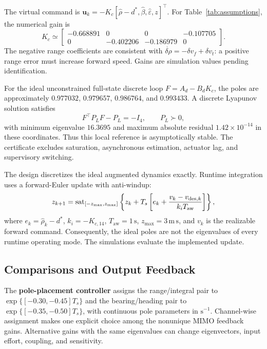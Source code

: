 The virtual command is $\mathbf u_k=-K_c[\hat\rho-d^\ast,\hat\beta,\hat\varepsilon,z]^\top$. For Table~\ref{tab:assumptions}, the numerical gain is
\begin{equation}
K_c\simeq\begin{bmatrix}
-0.668891&0&0&-0.107705\\
0&-0.402206&-0.186979&0
\end{bmatrix}.
\end{equation}
The negative range coefficients are consistent with $\dot{\delta\rho}=-\delta v_f+\delta v_t$: a positive range error must increase forward speed. Gains are simulation values pending identification.

For the ideal unconstrained full-state discrete loop $F=A_d-B_dK_c$, the poles are approximately $0.977032$, $0.979657$, $0.986764$, and $0.993433$. A discrete Lyapunov solution satisfies
\begin{equation}
F^\top P_LF-P_L=-I_4,\qquad P_L\succ0,
\end{equation}
with minimum eigenvalue $16.3695$ and maximum absolute residual $1.42\times10^{-14}$ in these coordinates. Thus this local reference is asymptotically stable. The certificate excludes saturation, asynchronous estimation, actuator lag, and supervisory switching.

The design discretizes the ideal augmented dynamics exactly. Runtime integration uses a forward-Euler update with anti-windup:
\begin{equation}
z_{k+1}=\operatorname{sat}_{[-z_{\max},z_{\max}]}\left\{z_k+T_s\left[e_k+\frac{v_k-v_{\mathrm{des},k}}{k_iT_{\mathrm{aw}}}\right]\right\},
\end{equation}
where $e_k=\hat\rho_k-d^\ast$, $k_i=-K_{c,14}$, $T_{\mathrm{aw}}=1\,\mathrm s$, $z_{\max}=3\,\mathrm{m\,s}$, and $v_k$ is the realizable forward command. Consequently, the ideal poles are not the eigenvalues of every runtime operating mode. The simulations evaluate the implemented update.

\subsection{Comparisons and Output Feedback}
The \textbf{pole-placement controller} assigns the range/integral pair to $\exp\{[-0.30,-0.45]T_s\}$ and the bearing/heading pair to $\exp\{[-0.35,-0.50]T_s\}$, with continuous pole parameters in $\mathrm{s^{-1}}$. Channel-wise assignment makes one explicit choice among the nonunique MIMO feedback gains. Alternative gains with the same eigenvalues can change eigenvectors, input effort, coupling, and sensitivity.

